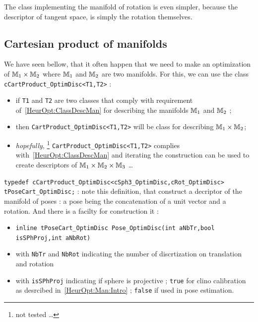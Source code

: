 The class implementing the manifold of rotation is even simpler, because the descriptor
of tangent space, is simply the rotation themselves.


\subsection{Cartesian product of manifolds}

We have seen bellow, that it often happen that we need to make an optimization
of $\mathbb{M}_1 \times \mathbb{M}_2$ where $\mathbb{M}_1$ and $\mathbb{M}_2$ are two manifolds. For
this, we can use  the class {\tt cCartProduct\_OptimDisc<T1,T2>} :

\begin{itemize}
    \item if {\tt T1} and {\tt T2} are two classes that comply with requirement
          of~\ref{HeurOpt:ClassDescMan} for describing the manifolds $\mathbb{M}_1$ and $\mathbb{M}_2$ ;
    \item then {\tt CartProduct\_OptimDisc<T1,T2>} will be class for describing
           $\mathbb{M}_1 \times \mathbb{M}_2$;
    \item  \emph{hopefully}, \footnote{not tested \dots}  {\tt CartProduct\_OptimDisc<T1,T2>} 
           complies with~\ref{HeurOpt:ClassDescMan} and iterating the construction can
           be used to create descriptors of $\mathbb{M}_1 \times \mathbb{M}_2 \times \mathbb{M}_3$ \dots
\end{itemize}

{\tt typedef cCartProduct\_OptimDisc<cSph3\_OptimDisc,cRot\_OptimDisc>  tPoseCart\_OptimDisc;} :
note this definition,
that construct a decriptor of the manifold of poses : a pose being the concatenation of a unit
vector and a rotation. And there is a facilty for construction it :

\begin{itemize}
  \item {\tt inline tPoseCart\_OptimDisc  Pose\_OptimDisc(int aNbTr,bool isSPhProj,int aNbRot)} 

  \item with {\tt NbTr} and {\tt NbRot} indicating the number of discrtization on translation and rotation


  \item with {\tt isSPhProj} indicating if sphere is projective ; {\tt true} for clino calibration
          as desrcibed in~\ref{HeurOpt:Man:Intro} ; {\tt false} if used in pose estimation.
\end{itemize}


